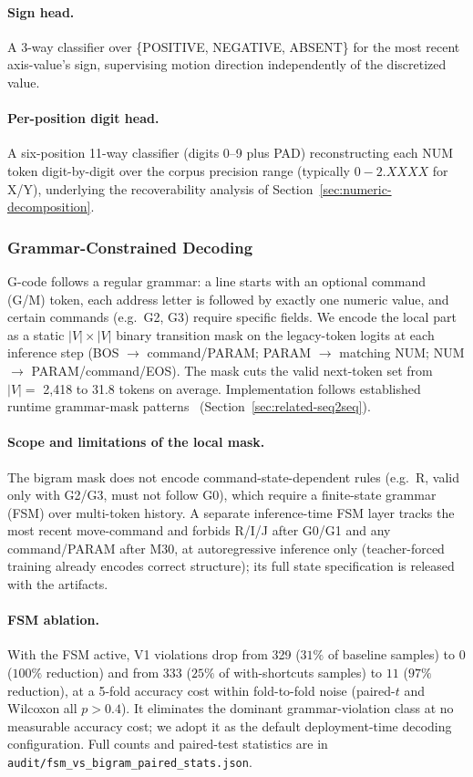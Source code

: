 \documentclass[sensors,article,submit,moreauthors,pdftex]{Definitions/mdpi}
\begin{document}
\paragraph{Sign head.} A 3-way classifier over \{POSITIVE, NEGATIVE, ABSENT\} for the most recent axis-value's sign, supervising motion direction independently of the discretized value.

\paragraph{Per-position digit head.} A six-position 11-way classifier (digits 0--9 plus PAD) reconstructing each NUM token digit-by-digit over the corpus precision range (typically $0\!-\!2\!.X\!X\!X\!X$ for X/Y), underlying the recoverability analysis of Section~\ref{sec:numeric-decomposition}.

\subsubsection{Grammar-Constrained Decoding}
\label{sec:grammar}

G-code follows a regular grammar: a line starts with an optional command (G/M) token, each address letter is followed by exactly one numeric value, and certain commands (e.g.\ G2, G3) require specific fields. We encode the local part as a static $|V| \times |V|$ binary transition mask on the legacy-token logits at each inference step (BOS $\to$ command/PARAM; PARAM $\to$ matching NUM; NUM $\to$ PARAM/command/EOS). The mask cuts the valid next-token set from $|V|=$ 2{,}418 to 31.8 tokens on average. Implementation follows established runtime grammar-mask patterns~\cite{picard,synchromesh,lmql,outlines,xgrammar,geng2023gcd} (Section~\ref{sec:related-seq2seq}).

\paragraph{Scope and limitations of the local mask.} The bigram mask does not encode command-state-dependent rules (e.g.\ R, valid only with G2/G3, must not follow G0), which require a finite-state grammar (FSM) over multi-token history. A separate inference-time FSM layer tracks the most recent move-command and forbids R/I/J after G0/G1 and any command/PARAM after M30, at autoregressive inference only (teacher-forced training already encodes correct structure); its full state specification is released with the artifacts.

\paragraph{FSM ablation.} With the FSM active, V1 violations drop from 329 ($31\%$ of baseline samples) to $0$ ($100\%$ reduction) and from 333 ($25\%$ of with-shortcuts samples) to $11$ ($97\%$ reduction), at a 5-fold accuracy cost within fold-to-fold noise (paired-$t$ and Wilcoxon all $p>0.4$). It eliminates the dominant grammar-violation class at no measurable accuracy cost; we adopt it as the default deployment-time decoding configuration. Full counts and paired-test statistics are in \texttt{audit/fsm\_vs\_bigram\_paired\_stats.json}.
\end{document}
